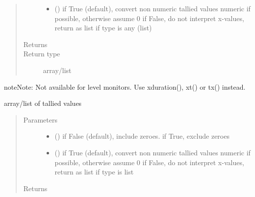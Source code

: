 \documentclass[letterpaper,10pt,english]{sphinxmanual}
\begin{document}
\begin{fulllineitems}
\begin{fulllineitems}
\begin{quote}
\begin{description}
\begin{itemize}
\item {} 
 () \textendash{} if True (default), convert non numeric tallied values numeric if possible, otherwise assume 0 
if False, do not interpret x-values, return as list if type is any (list)

\end{itemize}

\item[{Returns}] \leavevmode
{}

\item[{Return type}] \leavevmode
array/list

\end{description}\end{quote}

\begin{sphinxadmonition}{note}{Note:}
Not available for level monitors. Use xduration(), xt() or tx() instead.
\end{sphinxadmonition}

\end{fulllineitems}


\begin{fulllineitems}
\label{\detokenize{Reference:salabim.Monitor.xduration}}
array/list of tallied values
\begin{quote}\begin{description}
\item[{Parameters}] \leavevmode\begin{itemize}
\item {} 
 () \textendash{} if False (default), include zeroes. if True, exclude zeroes

\item {} 
 () \textendash{} if True (default), convert non numeric tallied values numeric if possible, otherwise assume 0 
if False, do not interpret x-values, return as list if type is list

\end{itemize}

\item[{Returns}] \leavevmode
{}


\end{description}
\end{quote}
\end{fulllineitems}
\end{fulllineitems}
\end{document}
